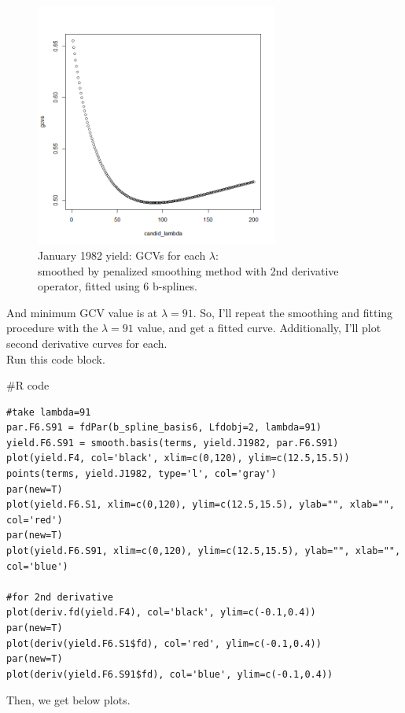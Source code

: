 \documentclass{article}
\newenvironment{Rcode}%
{%
    \begin{mdframed}
    \#R code
    \begin{small}
}
{%
    \end{small}
    \end{mdframed}
}
\begin{document}
\begin{figure}[hh]
    \centering
    \includegraphics[height=8cm]{1982Jyield_bspline6_lambda_gcv.png}
    \caption{January 1982 yield: GCVs for each $\lambda$:\\ smoothed by penalized smoothing method with 2nd derivative operator, fitted using 6 b-splines.}
\end{figure}

And minimum GCV value is at $\lambda=91$. So, I'll repeat the smoothing and fitting procedure with the $\lambda=91$ value,
and get a fitted curve. Additionally, I'll plot second derivative curves for each. \\Run this code block.
\begin{Rcode}
    \begin{verbatim}
#take lambda=91
par.F6.S91 = fdPar(b_spline_basis6, Lfdobj=2, lambda=91)
yield.F6.S91 = smooth.basis(terms, yield.J1982, par.F6.S91)
plot(yield.F4, col='black', xlim=c(0,120), ylim=c(12.5,15.5))
points(terms, yield.J1982, type='l', col='gray')
par(new=T)
plot(yield.F6.S1, xlim=c(0,120), ylim=c(12.5,15.5), ylab="", xlab="", col='red')
par(new=T)
plot(yield.F6.S91, xlim=c(0,120), ylim=c(12.5,15.5), ylab="", xlab="", col='blue')

#for 2nd derivative
plot(deriv.fd(yield.F4), col='black', ylim=c(-0.1,0.4))
par(new=T)
plot(deriv(yield.F6.S1$fd), col='red', ylim=c(-0.1,0.4))
par(new=T)
plot(deriv(yield.F6.S91$fd), col='blue', ylim=c(-0.1,0.4))
    \end{verbatim}
\end{Rcode}

Then, we get below plots.
\end{document}
